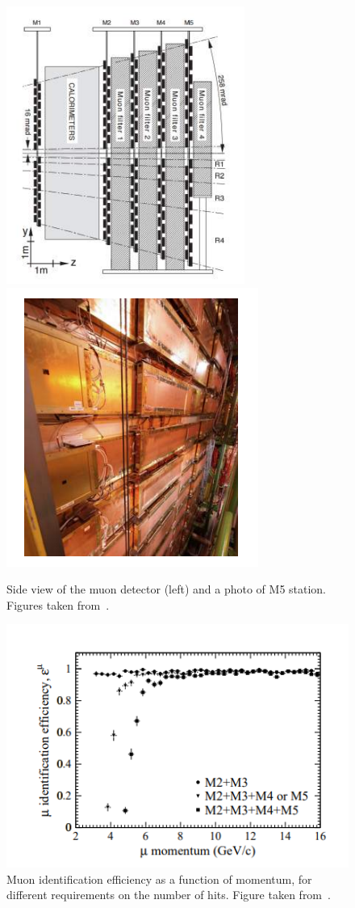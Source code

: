 \begin{figure}[h]
 \begin{center}
  \includegraphics[width=0.49\linewidth]{figures/muon_stations.PNG}
   \includegraphics[width=0.49\linewidth]{figures/muon_photo.PNG}
    \caption{Side view of the muon detector (left) and a photo of M5 station. Figures taken from~\cite{lhcb}.}%
    \label{fig:muon}%
 \end{center}
\end{figure}



\begin{figure}[h]
\centering
\includegraphics[scale=0.6]{figures/muon_eff.PNG}
\caption{Muon identification efficiency as a function of momentum, for different requirements on the number of hits. Figure taken from~\cite{muon_tdr}.
\label{fig:muon_missidentify}}
\end{figure}



